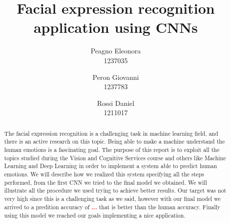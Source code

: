 \documentclass[10pt,twocolumn,letterpaper]{article}
\begin{document}
\title{Facial expression recognition application using CNNs}

\author{
Peagno Eleonora \\\normalsize 1237035\\
\and
Peron Giovanni \\\normalsize 1237783\\
\and
Rossi Daniel \\\normalsize 1211017\\
}

\maketitle

\begin{abstract}
   The facial expression recognition is a challenging task in machine learning field, 
   and there is an active research on this topic. Being able to make a machine understand 
   the human emotions is a fascinating goal.
   The purpose of this report is to exploit all the topics studied during 
   the Vision and Cognitive Services course and others like Machine Learning and Deep Learning
   in order to implement a system able to predict human emotions.
   We will describe how we realized this system specifying all the steps performed,
   from the first CNN we tried to the final model we obtained. 
   We will illustrate all the procedure we used trying to achieve better results.
   Our target was not very high since this is a challenging task as we said, however
   with our final model we arrived to a predition accuracy of \textbf{\textcolor{red}{...}} that is better than the human accuracy.
   Finally using this model we reached our goals implementing a nice application.
\end{abstract}
\end{document}
